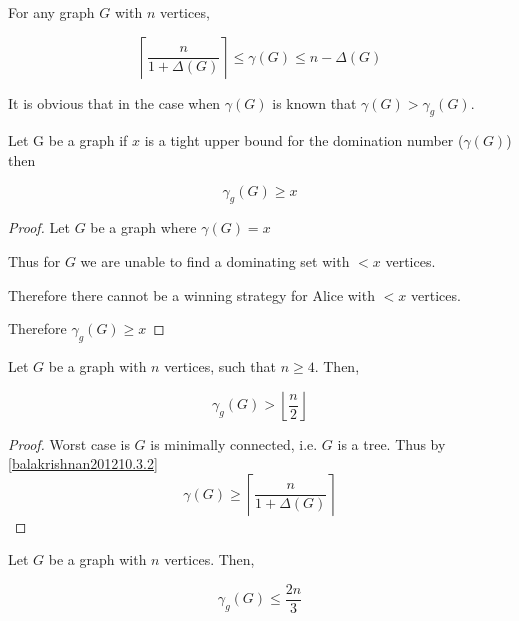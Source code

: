\begin{theorem} [Balakrishnan 2012 10.3.2] \label{balakrishnan201210.3.2}
    For any graph $G$ with $n$ vertices, 
    
    \[ \left\lceil {\frac{n}{1+\Delta(G)}} \right\rceil \leq \gamma(G) \leq n - \Delta(G)\]    \cite{balakrishnan2012}
    
\end{theorem}

    It is obvious that in the case when $\gamma(G)$ is known that $\gamma(G) > \gamma_g(G)$.
\begin{theorem}
    Let G be a graph if $x$ is a tight upper bound for the domination number ($\gamma(G)$) then  
    
    \[ \gamma_g(G) \geq x\]
    
\end{theorem}

\begin{proof}
    Let $G$ be a graph where $\gamma(G) = x$
 
    Thus for $G$ we are unable to find a dominating set with $ < x$ vertices.
    
    Therefore there cannot be a winning strategy for Alice with $< x$ vertices.
    
    Therefore $\gamma_g(G) \geq x$
\end{proof}


\begin{theorem} \label{minDomSize}
    Let $G$ be a graph with $n$ vertices, such that $n \geq 4$. Then,
    
    \[ \gamma_g(G) > \left \lfloor{\frac{n}{2}}\right \rfloor \]
    
\end{theorem}

\begin{proof}
Worst case is $G$ is minimally connected, i.e. $G$ is a tree. Thus by \ref{balakrishnan201210.3.2} 
\[\gamma(G) \geq \left\lceil {\frac{n}{1+\Delta(G)}} \right\rceil\]       
\end{proof}

\begin{theorem}
    Let $G$ be a graph with $n$ vertices. Then,
    
    \[ \gamma_g(G) \leq \frac{2n}{3}\]
\end{theorem}
















